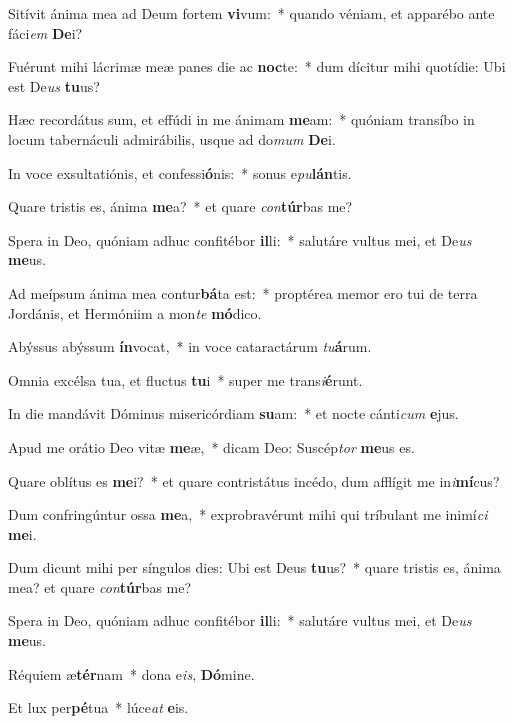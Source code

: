 \item Sitívit ánima mea ad Deum fortem \textbf{vi}vum:~* quando véniam, et apparébo ante fáci\textit{em} \textbf{De}i?

\item Fuérunt mihi lácrimæ meæ panes die ac \textbf{noc}te:~* dum dícitur mihi quotídie: Ubi est De\textit{us} \textbf{tu}us?

\item Hæc recordátus sum, et effúdi in me ánimam \textbf{me}am:~* quóniam transíbo in locum tabernáculi admirábilis, usque ad do\textit{mum} \textbf{De}i.

\item In voce exsultatiónis, et confessi\textbf{ó}nis:~* sonus e\textit{pu}\textbf{lán}tis.

\item Quare tristis es, ánima \textbf{me}a?~* et quare \textit{con}\textbf{túr}bas me?

\item Spera in Deo, quóniam adhuc confitébor \textbf{il}li:~* salutáre vultus mei, et De\textit{us} \textbf{me}us.

\item Ad meípsum ánima mea contur\textbf{bá}ta est:~* proptérea memor ero tui de terra Jordánis, et Hermóniim a mon\textit{te} \textbf{mó}dico.

\item Abýssus abýssum \textbf{ín}vocat,~* in voce cataractárum \textit{tu}\textbf{á}rum.

\item Omnia excélsa tua, et fluctus \textbf{tu}i~* super me trans\textit{i}\textbf{é}runt.

\item In die mandávit Dóminus misericórdiam \textbf{su}am:~* et nocte cánti\textit{cum} \textbf{e}jus.

\item Apud me orátio Deo vitæ \textbf{me}æ,~* dicam Deo: Suscép\textit{tor} \textbf{me}us es.

\item Quare oblítus es \textbf{me}i?~* et quare contristátus incédo, dum afflígit me in\textit{i}\textbf{mí}cus?

\item Dum confringúntur ossa \textbf{me}a,~* exprobravérunt mihi qui tríbulant me inimí\textit{ci} \textbf{me}i.

\item Dum dicunt mihi per síngulos dies: Ubi est Deus \textbf{tu}us?~* quare tristis es, ánima mea? et quare \textit{con}\textbf{túr}bas me?

\item Spera in Deo, quóniam adhuc confitébor \textbf{il}li:~* salutáre vultus mei, et De\textit{us} \textbf{me}us.

\item Réquiem æ\textbf{tér}nam~* dona e\textit{is}, \textbf{Dó}mine.

\item Et lux per\textbf{pé}tua~* lúce\textit{at} \textbf{e}is.